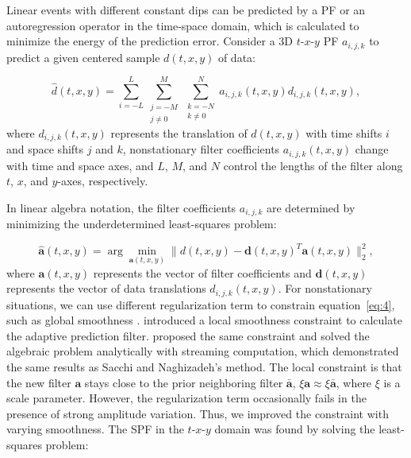 Linear events with different constant dips can be predicted by a PF or
an autoregression operator in the time-space domain, which is
calculated to minimize the energy of the prediction error. Consider a
3D $t$-$x$-$y$ PF $a_{i,j,k}$ to predict a given centered sample
$d(t,x,y)$ of data:

\begin{equation}
  \label{eq:1}
  \widehat{d}(t,x,y) = \sum_{i=-L}^{L}\sum_{\substack{j=-M\\ j\ne0}}^{M}\sum_{\substack{k=-N\\k\ne0}}^{N}a_{i,j,k}(t,x,y)d_{i,j,k}(t,x,y),
\end{equation}
where $d_{i,j,k}(t,x,y)$ represents the translation of $d(t,x,y)$ with
time shifts $i$ and space shifts $j$ and $k$, nonstationary filter
coefficients $a_{i,j,k}(t,x,y)$ change with time and space axes, and
$L$, $M$, and $N$ control the lengths of the filter along $t$, $x$,
and $y$-axes, respectively.

In linear algebra notation, the filter coefficients $a_{i,j,k}$ are
determined by minimizing the underdetermined least-squares problem:

\begin{equation}
  \label{eq:4}
  \widehat{\mathbf{a}}(t,x,y)=\arg\min_{\mathbf{a}(t,x,y)}\parallel d(t,x,y)-\mathbf{d}(t,x,y)^{T}\mathbf{a}(t,x,y)\parallel_{2}^{2},
\end{equation}
where $\mathbf{a}(t,x,y)$ represents the vector of filter coefficients
and $\mathbf{d}(t,x,y)$ represents the vector of data translations
$d_{i,j,k}(t,x,y)$.  For nonstationary situations, we can use
different regularization term to constrain equation~\ref{eq:4}, such
as global smoothness \cite[]{Liu11}. \cite{Sacchi09} introduced a
local smoothness constraint to calculate the adaptive prediction
filter. \cite{Fomel16} proposed the same constraint and solved the
algebraic problem analytically with streaming computation, which
demonstrated the same results as Sacchi and Naghizadeh's method.  The
local constraint is that the new filter $\mathbf{a}$ stays close to
the prior neighboring filter $\mathbf{\bar{a}}$,
$\xi\mathbf{a}\approx\xi\mathbf{\bar{a}}$, where $\xi$ is a scale
parameter. However, the regularization term occasionally fails in the
presence of strong amplitude variation. Thus, we improved the
constraint with varying smoothness. The SPF in the $t$-$x$-$y$ domain
was found by solving the least-squares problem:


